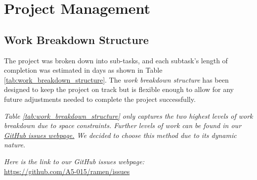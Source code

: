 \section{Project Management}
\subsection{Work Breakdown Structure}
The project was broken down into sub-tasks, and each subtask's length of completion was estimated in days as shown in Table \ref{tab:work_breakdown_structure}. The \emph{work breakdown structure} has been designed to keep the project on track but is flexible enough to allow for any future adjustments needed to complete the project successfully.

\textit{Table \ref{tab:work_breakdown_structure} only captures the two highest levels of work breakdown due to space constraints. Further levels of work can be found in our \href{https://github.com/A5-015/ramen/issues?q=is\%3Aissue+sort\%3Aupdated-desc}{GitHub issues webpage.} We decided to choose this method due to its dynamic nature.}

\textit{Here is the link to our GitHub issues webpage:}\\
\url{https://github.com/A5-015/ramen/issues}

